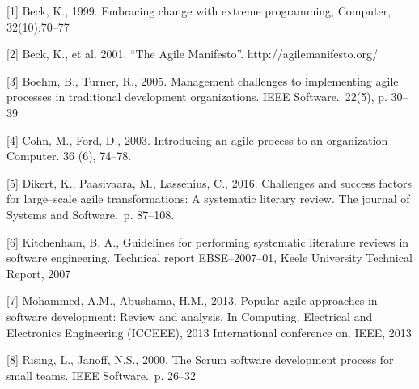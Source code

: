 \renewcommand{\baselinestretch}{1.0}
\setlength{\parskip}{0.5em}

[1] Beck, K., 1999. Embracing change with extreme programming, Computer,
32(10):70–77

[2] Beck, K., et al. 2001. ``The Agile Manifesto''.
http://agilemanifesto.org/

[3] Boehm, B., Turner, R., 2005. Management challenges to implementing agile
processes in traditional development organizations. IEEE Software.\ 22(5), p. 30–39

[4] Cohn, M., Ford, D., 2003. Introducing an agile process to an
organization Computer. 36 (6), 74–78.

[5] Dikert, K., Paasivaara, M., Lassenius, C., 2016. Challenges and success factors
for large–scale agile transformations: A systematic literary review. The journal
of Systems and Software.\ p. 87–108.

[6] Kitchenham, B. A., Guidelines for performing systematic literature
reviews in software engineering. Technical report EBSE–2007–01, Keele University
Technical Report, 2007

[7] Mohammed, A.M., Abushama, H.M., 2013. Popular agile approaches in software
development: Review and analysis. In Computing, Electrical and Electronics
Engineering (ICCEEE), 2013 International conference on. IEEE, 2013

[8] Rising, L., Janoff, N.S., 2000. The Scrum software development process for small teams. IEEE Software.\ p. 26–32
